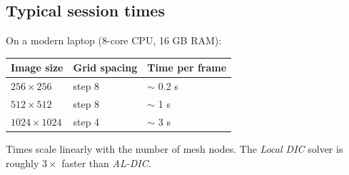 \subsection{Typical session times}

On a modern laptop (8-core CPU, 16 GB RAM):

\begin{center}
\begin{tabular}{lll}
  \toprule
  Image size & Grid spacing & Time per frame \\
  \midrule
  $256 \times 256$  & step 8   & $\sim$ 0.2 s \\
  $512 \times 512$  & step 8   & $\sim$ 1 s   \\
  $1024 \times 1024$ & step 4  & $\sim$ 3 s   \\
  \bottomrule
\end{tabular}
\end{center}

Times scale linearly with the number of mesh nodes. The
\emph{Local DIC} solver is roughly $3\times$ faster than
\emph{AL-DIC}.
